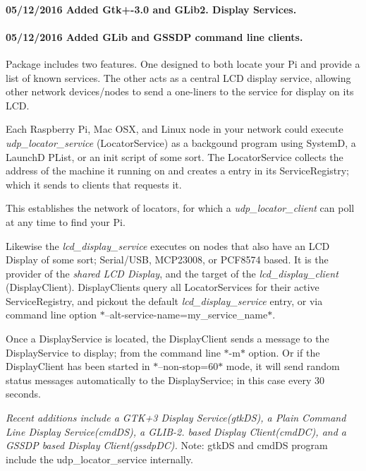 \paragraph*{05/12/2016 Added Gtk+-\/3.0 and G\+Lib2. Display Services.}

  

\paragraph*{05/12/2016 Added G\+Lib and G\+S\+S\+D\+P command line clients.}



Package includes two features. One designed to both locate your Pi and provide a list of known services. The other acts as a central L\+C\+D display service, allowing other network devices/nodes to send a one-\/liners to the service for display on its L\+C\+D.

Each Raspberry Pi, Mac O\+S\+X, and Linux node in your network could execute {\itshape udp\+\_\+locator\+\_\+service} (Locator\+Service) as a backgound program using System\+D, a Launch\+D P\+List, or an init script of some sort. The Locator\+Service collects the address of the machine it running on and creates a entry in its Service\+Registry; which it sends to clients that requests it.

This establishes the network of locators, for which a {\itshape udp\+\_\+locator\+\_\+client} can poll at any time to find your Pi.

Likewise the {\itshape lcd\+\_\+display\+\_\+service} executes on nodes that also have an L\+C\+D Display of some sort; Serial/\+U\+S\+B, M\+C\+P23008, or P\+C\+F8574 based. It is the provider of the {\itshape shared L\+C\+D Display}, and the target of the {\itshape lcd\+\_\+display\+\_\+client} (Display\+Client). Display\+Clients query all Locator\+Services for their active Service\+Registry, and pickout the default {\itshape lcd\+\_\+display\+\_\+service} entry, or via command line option $\ast$--alt-\/service-\/name=my\+\_\+service\+\_\+name$\ast$.

Once a Display\+Service is located, the Display\+Client sends a message to the Display\+Service to display; from the command line $\ast$-\/m$\ast$ option. Or if the Display\+Client has been started in $\ast$--non-\/stop=60$\ast$ mode, it will send random status messages automatically to the Display\+Service; in this case every 30 seconds.

{\itshape Recent additions include a G\+T\+K+3 Display Service(gtk\+D\+S), a Plain Command Line Display Service(cmd\+D\+S), a G\+L\+I\+B-\/2. based Display Client(cmd\+D\+C), and a G\+S\+S\+D\+P based Display Client(gssdp\+D\+C).} Note\+: gtk\+D\+S and cmd\+D\+S program include the udp\+\_\+locator\+\_\+service internally.

